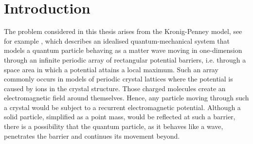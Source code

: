 \chapter{Introduction} \label{chap:1}

The problem considered in this thesis arises from the Kronig-Penney model, see for example \cite[chapter 3]{heering2002elektrophysik}, which describes an idealised quantum-mechanical system that models a quantum particle behaving as a matter wave moving in one-dimension through an infinite periodic array of rectangular potential barriers, i.e. through a space area in which a potential attains a local maximum. Such an array commonly occurs in models of periodic crystal lattices where the potential is caused by ions in the crystal structure. Those charged molecules create an electromagnetic field around themselves. Hence, any particle moving through such a crystal would be subject to a recurrent electromagnetic potential. Although a solid particle, simplified as a point mass, would be reflected at such a barrier, there is a possibility that the quantum particle, as it behaves like a wave, penetrates the barrier and continues its movement beyond. 
~\\

